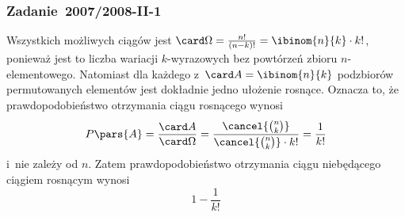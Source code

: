 \subsubsection*{Zadanie~2007/2008-II-1}
Wszystkich możliwych ciągów jest \(\card\Omega = \frac{n!}{(n - k)!} = \ibinom{n}{k} \cdot k!\), ponieważ jest to liczba wariacji \(k\)-wyrazowych bez powtórzeń zbioru \(n\)-elementowego. Natomiast dla każdego z~\(\card A = \ibinom{n}{k}\) podzbiorów permutowanych elementów jest dokładnie jedno ułożenie rosnące. Oznacza to, że prawdopodobieństwo otrzymania ciągu rosnącego wynosi
\begin{equation*}
    P\pars{A}
        = \frac{\card A}{\card\Omega}
        = \frac{\cancel{\binom{n}{k}}}{\cancel{\binom{n}{k}} \cdot k!}
        = \frac{1}{k!}
\end{equation*}
i~nie zależy od \(n\). Zatem prawdopodobieństwo otrzymania ciągu niebędącego ciągiem rosnącym wynosi
\begin{equation*}
    1 - \frac{1}{k!}
\end{equation*}
